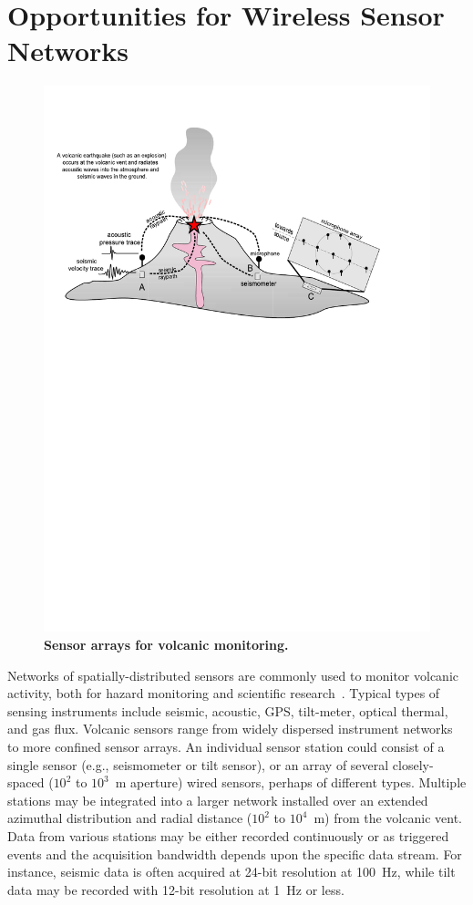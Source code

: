 \section{Opportunities for Wireless Sensor Networks}

\begin{figure}[t] 
\begin{center} 
\includegraphics[width=0.9\hsize,clip=true,bb=20 470 540 770]{./2-related/figs/Cartoon2.pdf}
\end{center} 
\caption{\textbf{Sensor arrays for volcanic monitoring.}}
\label{introduction-fig-cartoon} 
\end{figure}

Networks of spatially-distributed sensors are commonly used to monitor
volcanic activity, both for hazard monitoring and scientific
research~\cite{Scarpa96}.  Typical types of sensing instruments include
seismic, acoustic, GPS, tilt-meter, optical thermal, and gas flux.  Volcanic
sensors range from widely dispersed instrument networks to more confined
sensor arrays. An individual sensor station could consist of a single sensor
(e.g., seismometer or tilt sensor), or an array of several closely-spaced
($10^2$ to $10^3$~m aperture) wired sensors, perhaps of different types.
Multiple stations may be integrated into a larger network installed over an
extended azimuthal distribution and radial distance ($10^2$ to $10^4$~m) from
the volcanic vent.  Data from various stations may be either recorded
continuously or as triggered events and the acquisition bandwidth depends
upon the specific data stream. For instance, seismic data is often acquired
at 24-bit resolution at 100~Hz, while tilt data may be recorded with 12-bit
resolution at 1~Hz or less.

